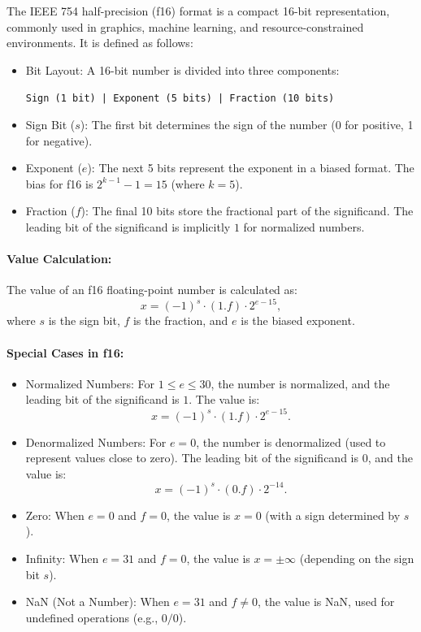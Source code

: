 The IEEE 754 half-precision (f16) format is a compact 16-bit representation, commonly used in graphics, machine learning, and resource-constrained environments. It is defined as follows:

\begin{itemize}
    \item Bit Layout: A 16-bit number is divided into three components:
    \begin{center}
    \texttt{Sign (1 bit) | Exponent (5 bits) | Fraction (10 bits)}
    \end{center}
    \item Sign Bit (\( s \)): The first bit determines the sign of the number (0 for positive, 1 for negative).
    \item Exponent (\( e \)): The next 5 bits represent the exponent in a biased format. The bias for f16 is \( 2^{k-1} - 1 = 15 \) (where \( k = 5 \)).
    \item Fraction (\( f \)): The final 10 bits store the fractional part of the significand. The leading bit of the significand is implicitly \( 1 \) for normalized numbers.
\end{itemize}

\paragraph{Value Calculation:}
The value of an f16 floating-point number is calculated as:
\[
x = (-1)^s \cdot (1.f) \cdot 2^{e - 15},
\]
where \( s \) is the sign bit, \( f \) is the fraction, and \( e \) is the biased exponent.

\paragraph{Special Cases in f16:}
\begin{itemize}
    \item Normalized Numbers: For \( 1 \leq e \leq 30 \), the number is normalized, and the leading bit of the significand is \( 1 \). The value is:
    \[
    x = (-1)^s \cdot (1.f) \cdot 2^{e - 15}.
    \]
    \item Denormalized Numbers: For \( e = 0 \), the number is denormalized (used to represent values close to zero). The leading bit of the significand is \( 0 \), and the value is:
    \[
    x = (-1)^s \cdot (0.f) \cdot 2^{-14}.
    \]
    \item Zero: When \( e = 0 \) and \( f = 0 \), the value is \( x = 0 \) (with a sign determined by \( s \)).
    \item Infinity: When \( e = 31 \) and \( f = 0 \), the value is \( x = \pm \infty \) (depending on the sign bit \( s \)).
    \item NaN (Not a Number): When \( e = 31 \) and \( f \neq 0 \), the value is NaN, used for undefined operations (e.g., \( 0/0 \)).
\end{itemize}

